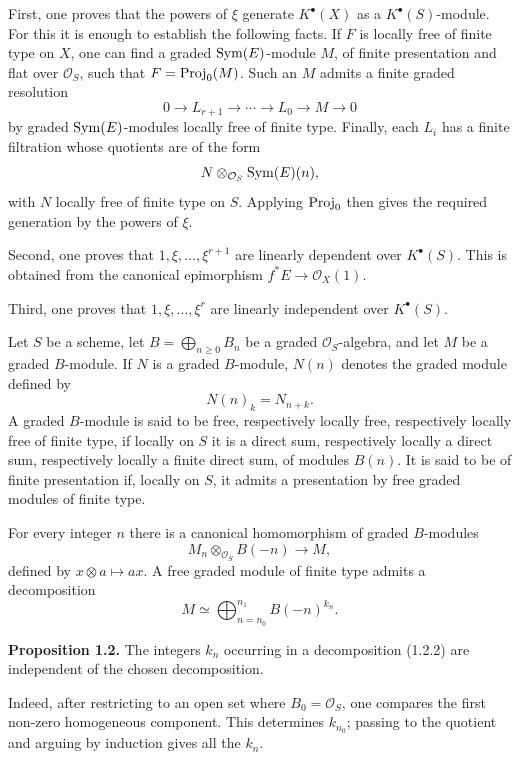 \documentclass[11pt]{article}
\begin{document}
First, one proves that the powers of \(\xi\) generate \(K^\bullet(X)\) as a \(K^\bullet(S)\)-module. For this it is enough to establish the following facts. If \(F\) is locally free of finite type on \(X\), one can find a graded \(\operatorname{Sym}(E)\)-module \(M\), of finite presentation and flat over \(\mathcal O_S\), such that \(F=\operatorname{Proj}_0(M)\). Such an \(M\) admits a finite graded resolution
\[
  0\longrightarrow L_{r+1}\longrightarrow \cdots \longrightarrow L_0\longrightarrow M\longrightarrow 0
\]
by graded \(\operatorname{Sym}(E)\)-modules locally free of finite type. Finally, each \(L_i\) has a finite filtration whose quotients are of the form
\[
  N\otimes_{\mathcal O_S}\operatorname{Sym}(E)(n),
\]
with \(N\) locally free of finite type on \(S\). Applying \(\operatorname{Proj}_0\) then gives the required generation by the powers of \(\xi\).

Second, one proves that \(1,\xi,\ldots,\xi^{r+1}\) are linearly dependent over \(K^\bullet(S)\). This is obtained from the canonical epimorphism \(f^*E\to\mathcal O_X(1)\).

Third, one proves that \(1,\xi,\ldots,\xi^r\) are linearly independent over \(K^\bullet(S)\).

Let \(S\) be a scheme, let \(B=\bigoplus_{n\geq 0}B_n\) be a graded \(\mathcal O_S\)-algebra, and let \(M\) be a graded \(B\)-module. If \(N\) is a graded \(B\)-module, \(N(n)\) denotes the graded module defined by
\[
  N(n)_k=N_{n+k}.
\]
A graded \(B\)-module is said to be free, respectively locally free, respectively locally free of finite type, if locally on \(S\) it is a direct sum, respectively locally a direct sum, respectively locally a finite direct sum, of modules \(B(n)\). It is said to be of finite presentation if, locally on \(S\), it admits a presentation by free graded modules of finite type.

For every integer \(n\) there is a canonical homomorphism of graded \(B\)-modules
\begin{equation}\tag{1.2.1}
  M_n\otimes_{\mathcal O_S}B(-n)\longrightarrow M,
\end{equation}
defined by \(x\otimes a\mapsto ax\). A free graded module of finite type admits a decomposition
\begin{equation}\tag{1.2.2}
  M\simeq \bigoplus_{n=n_0}^{n_1} B(-n)^{k_n}.
\end{equation}

\textbf{Proposition 1.2.} The integers \(k_n\) occurring in a decomposition (1.2.2) are independent of the chosen decomposition.

Indeed, after restricting to an open set where \(B_0=\mathcal O_S\), one compares the first non-zero homogeneous component. This determines \(k_{n_0}\); passing to the quotient and arguing by induction gives all the \(k_n\).
\end{document}
